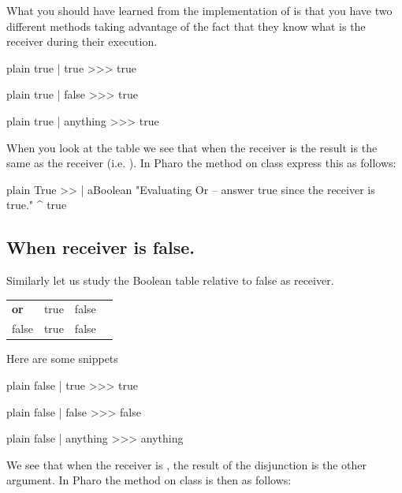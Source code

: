 \documentclass[10pt,twoside,english]{_support/latex/sbabook/sbabook}
\begin{document}
 What you should have learned from the implementation of  is that you have two different methods taking advantage of the fact that they know what is the receiver during their execution. 

\begin{displaycode}{plain}
true | true 
>>> true
\end{displaycode}

\begin{displaycode}{plain}
true | false 
>>> true
\end{displaycode}

\begin{displaycode}{plain}
true | anything 
>>> true
\end{displaycode}

When you look at the table we see that when the receiver is  the result is the same as the receiver (i.e. ). In Pharo the method \textcode{\textbar{}} on class  express this as follows: 

\begin{displaycode}{plain}
True >> | aBoolean
   "Evaluating Or -- answer true since the receiver is true."
   ^ true
\end{displaycode}
\subsection{When receiver is false.}
Similarly let us study the Boolean table relative to false as receiver. 

\begin{tabular}{llll}
\toprule
\textbf{or} & true & false &  \\
false & true & false &  \\
\bottomrule
\end{tabular}

Here are some snippets

\begin{displaycode}{plain}
false | true 
>>> true
\end{displaycode}

\begin{displaycode}{plain}
false | false 
>>> false
\end{displaycode}

\begin{displaycode}{plain}
false | anything 
>>> anything
\end{displaycode}

We see that when the receiver is , the result of the disjunction is the other argument. In Pharo the method \textcode{\textbar{}} on class  is then as follows: 
\end{document}
